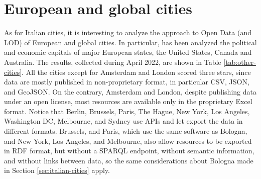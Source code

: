 \section{European and global cities}
\label{sec:other-cities}

As for Italian cities, it is interesting to analyze the approach to Open Data (and \acl{LOD}) of European and global cities. In particular, has been analyzed the political and economic capitals of major European states, the United States, Canada and Australia. The results, collected during April 2022, are shown in Table \ref{tab:other-cities}. All the cities except for Amsterdam and London scored three stars, since data are mostly published in non-proprietary format, in particular \ac{CSV}, \ac{JSON}, and Geo\ac{JSON}. On the contrary, Amsterdam and London, despite publishing data under an open license, most resources are available only in the proprietary Excel format. Notice that Berlin, Brussels, Paris, The Hague, New York, Los Angeles, Washington DC, Melbourne, and Sydney use \acsp{API} and let export the data in different formats.
Brussels, and Paris, which use the same software as Bologna, and New York, Los Angeles, and Melbourne, also allow resources to be exported in \ac{RDF} format, but without a \ac{SPARQL} endpoint, without semantic information, and without links between data, so the same considerations about Bologna made in Section \ref{sec:italian-cities} apply.

